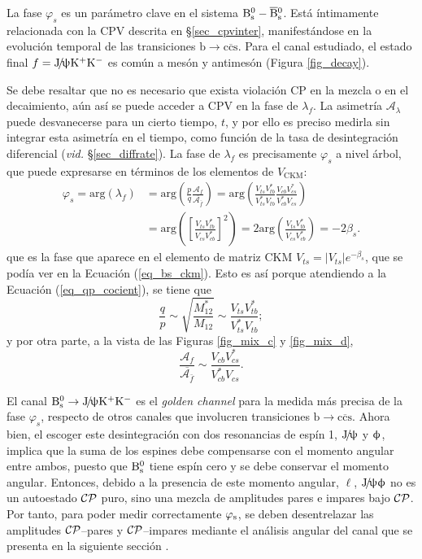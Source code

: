 La fase $\varphi_s$ es un parámetro clave en el sistema $\text{B}{}_{\text{s}}^{\text{0}} - \overline{\text{B}}{}_{\text{s}}^{\text{0}}$. Está íntimamente relacionada con la CPV descrita en \S \ref{sec_cpvinter}, manifestándose  en la evolución temporal de las transiciones $\mathrm{b \rightarrow c \overline{c}{s}}$. Para el canal estudiado, el estado final $f=\text{J}\!/\!\uppsi \text{K}{}^{+}\text{K}{}^{-}$ es común a mesón y antimesón (Figura \ref{fig_decay}). 

Se debe resaltar que no es necesario que exista violación CP en la mezcla o en el decaimiento, aún así se puede acceder a CPV en la fase de $\lambda_f$. La asimetría $\mathscr{A}_{\lambda}$ puede desvanecerse para un cierto tiempo, $t$, y por ello es preciso medirla sin integrar esta asimetría en el tiempo, como función de la tasa de desintegración diferencial (\emph{vid.} \S \ref{sec_diffrate}). La fase de $\lambda_f$ es precisamente $\varphi_s$ \color{vero} a nivel árbol, \color{norm} que puede expresarse en términos de los elementos de $V_{\text{CKM}}$:
\begin{equation}
\begin{split}
  \varphi_s = \text{arg} (\lambda_f) & =  \text{arg}\left(\frac{p}{q}  \frac{\mathcal{A}_f}{\overline{\mathcal{A}_{\bar{f}}}}\right) =   \text{arg}\left(\frac{V_{ts}V_{tb}^*}{V_{ts}^*V_{tb}} \frac{V_{cb}V_{cs}^*}{V_{cb}^*V_{cs}} \right) \\ &=   \text{arg} \left(  \left[ \frac{V_{ts} V_{tb}^*}{V_{cs} V_{cb}^*}  \right]^2  \right) = 2 \text{arg} \left(   \frac{V_{ts} V_{tb}^*}{V_{cs} V_{cb}^*}    \right)  =  - 2\beta_s.
\end{split}
\end{equation}
que es la fase que aparece en el elemento de matriz \textsc{CKM} $V_{ts} = |V_{ts}| e^{- \beta_s}$, que se podía ver en la Ecuación (\ref{eq_bs_ckm}).
%
Esto es así porque atendiendo a la Ecuación (\ref{eq_qp_cocient}), se tiene que
\[\frac{q}{p} \sim \sqrt{\frac {M_{12}^*} {M_{12}} } \sim \frac{V_{ts}V_{tb}^*}{V_{ts}^*V_{tb}}; \]
y por otra parte, a la vista de las Figuras \ref{fig_mix_c} y \ref{fig_mix_d},
\[\frac{\mathcal{A}_f}{\overline{\mathcal{A}_{\bar{f}}}} \sim \frac{V_{cb}V_{cs}^*}{V_{cb}^*V_{cs}}.\]



El canal $\text{B}{}_{\text{s}}^{\text{0}} \rightarrow \text{J}\!/\!\uppsi \text{K}{}^{+}\text{K}{}^{-}$ es el \emph{golden channel} para la medida más precisa de la fase $\varphi_s$, respecto de otros canales que involucren transiciones $\mathrm{b \rightarrow c\overline{c}s}$. Ahora bien, el escoger este desintegración con dos resonancias de \color{vero} espín 1, \color{norm} $\text{J}\!/\!\uppsi$ y $\upphi$, implica que la suma de los espines debe compensarse con el momento angular entre ambos, puesto que $\text{B}{}_{\text{s}}^{\text{0}}$ tiene espín cero y se debe conservar el momento angular. Entonces, debido a la presencia de este momento angular, $\ell$, $\text{J}\!/\!\uppsi \upphi$ no es un autoestado $\mathcal{CP}$ puro, sino una mezcla de amplitudes pares e impares bajo $\mathcal{CP}$. Por tanto, para poder medir correctamente $\varphi_{\text{s}}$, se deben desentrelazar las amplitudes $\mathcal{CP}$--pares y $\mathcal{CP}$--impares mediante el análisis angular del canal que se presenta en la siguiente sección \cite{paperPhis}.



